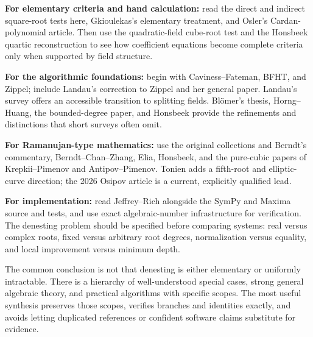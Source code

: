 \documentclass[11pt,a4paper]{article}
\theoremstyle{definition}
\theoremstyle{remark}
\numberwithin{equation}{section}
\begin{document}
\textbf{For elementary criteria and hand calculation:} read the direct and indirect square-root tests here, Gkioulekas's elementary treatment, and Osler's Cardan-polynomial article. Then use the quadratic-field cube-root test and the Honsbeek quartic reconstruction to see how coefficient equations become complete criteria only when supported by field structure.\cite{gkioulekas,osler,honsbeek2005}

\textbf{For the algorithmic foundations:} begin with Caviness--Fateman, BFHT, and Zippel; include Landau's correction to Zippel and her general paper. Landau's survey offers an accessible transition to splitting fields. Bl\"omer's thesis, Horng--Huang, the bounded-degree paper, and Honsbeek provide the refinements and distinctions that short surveys often omit.\cite{cavinessfateman,bfht,zippel,landaunote,landau,landausurvey,blomerthesis,horng1999,blomer2000,honsbeek2005}

\textbf{For Ramanujan-type mathematics:} use the original collections and Berndt's commentary, Berndt--Chan--Zhang, Elia, Honsbeek, and the pure-cubic papers of Krepkii--Pimenov and Antipov--Pimenov. Tonien adds a fifth-root and elliptic-curve direction; the 2026 Osipov article is a current, explicitly qualified lead.\cite{ramanujan,berndtII,berndtchan1998,elia,honsbeek2005,krepkii,antipov,tonien,osipov2026}

\textbf{For implementation:} read Jeffrey--Rich alongside the SymPy and Maxima source and tests, and use exact algebraic-number infrastructure for verification. The denesting problem should be specified before comparing systems: real versus complex roots, fixed versus arbitrary root degrees, normalization versus equality, and local improvement versus minimum depth.\cite{jeffreyrich,sympysource,sympytests,maximaraddenest,sageqqbar,pari}

The common conclusion is not that denesting is either elementary or uniformly intractable. There is a hierarchy of well-understood special cases, strong general algebraic theory, and practical algorithms with specific scopes. The most useful synthesis preserves those scopes, verifies branches and identities exactly, and avoids letting duplicated references or confident software claims substitute for evidence.
\end{document}
